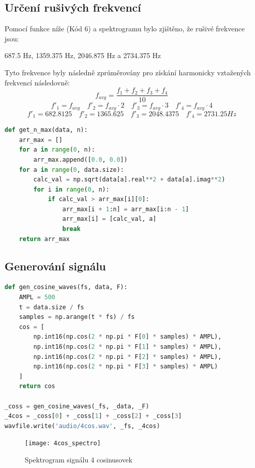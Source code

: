 \documentclass{article}
\begin{document}
\subsection{Určení rušivých frekvencí} 
\begin{flushleft}
    Pomocí funkce níže (Kód 6) a spektrogramu bylo zjištěno, že rušivé frekvence jsou:
    \begin{center}
    687.5 Hz, 1359.375 Hz, 2046.875 Hz a 2734.375 Hz
    \end{center}

    Tyto frekvence byly následně zprůměrovány pro získání harmonicky vztažených frekvencí následovně: \\
    \[
    f_{avg} = \frac{f_1 + f_2 + f_3 + f_4}{10}
    \]
    \[
    f'_1 = f_{avg} \quad f'_2 = f_{avg} \cdot 2 \quad f'_3 = f_{avg} \cdot 3 \quad f'_4 = f_{avg} \cdot 4
    \]
    \[
        f'_1 = 682.8125 \quad f'_2 = 1365.625 \quad f'_3 = 2048.4375 \quad f'_4 = 2731.25 Hz
    \]

\begin{lstlisting}[language=Python, caption={Funkce pro nalezení 'n' největších hodnot z výsledku DFT/FFT}]
def get_n_max(data, n):
    arr_max = []
    for a in range(0, n):
        arr_max.append([0.0, 0.0])
    for a in range(0, data.size):
        calc_val = np.sqrt(data[a].real**2 + data[a].imag**2)
        for i in range(0, n):
            if calc_val > arr_max[i][0]:
                arr_max[i + 1:n] = arr_max[i:n - 1]
                arr_max[i] = [calc_val, a]
                break
    return arr_max
\end{lstlisting}
\end{flushleft}

\newpage


\subsection{Generování signálu}
\begin{flushleft}

\begin{lstlisting}[language=Python, caption={Funkce pro generování 4 cosinusovek}]
def gen_cosine_waves(fs, data, F):
    AMPL = 500
    t = data.size / fs
    samples = np.arange(t * fs) / fs
    cos = [
        np.int16(np.cos(2 * np.pi * F[0] * samples) * AMPL),
        np.int16(np.cos(2 * np.pi * F[1] * samples) * AMPL),
        np.int16(np.cos(2 * np.pi * F[2] * samples) * AMPL),
        np.int16(np.cos(2 * np.pi * F[3] * samples) * AMPL)
    ]
    return cos

_coss = gen_cosine_waves(_fs, _data, _F)
_4cos = _coss[0] + _coss[1] + _coss[2] + _coss[3]
wavfile.write('audio/4cos.wav', _fs, _4cos)
\end{lstlisting}
    \begin{figure}[ht]
        \centering
        \texttt{[image: 4cos\_spectro]}
        \caption{Spektrogram signálu 4 cosinusovek}
    \end{figure}
\end{flushleft}
\end{document}
